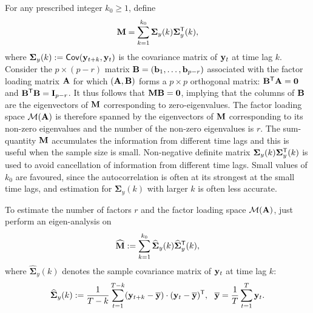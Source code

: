 \documentclass{article} %
\begin{document}


For any prescribed integer $k_0\geq 1$, define
\begin{equation}
{\bf M}=\sum_{k=1}^{k_0}{\bm\Sigma}_y(k){\bm\Sigma}^{\sf T}_y(k),
\end{equation}
where ${\bm\Sigma}_y(k):={\sf Cov}({\bf y}_{t+k},{\bf y}_t)$ is the covariance matrix of ${\bf y}_t$ at time lag $k$.
Consider the $p\times(p-r)$ matrix ${\bf B}=({\bf b}_1,\ldots,{\bf b}_{p-r})$ associated with the factor loading matrix $\bf A$ for which $({\bf A},{\bf B})$ forms a $p\times p$ orthogonal matrix: ${\bf B}^{\sf T}{\bf A}={\bf 0}$ and ${\bf B}^{\sf T}{\bf B}={\bf I}_{p-r}$. It thus follows that ${\bf MB=0}$, implying that the columns of $\bf B$ are the eigenvectors of $\bf M$ corresponding to zero-eigenvalues. The factor loading space ${\cal M}({\bf A})$ is therefore spanned by the eigenvectors of $\bf M$ corresponding to its non-zero eigenvalues and the number of the non-zero eigenvalues is $r$. The sum-quantity $\bf M$ accumulates the information from different time lags and this is useful when the sample size is small. Non-negative definite matrix ${\bf \Sigma}_y(k){\bf\Sigma}^{\sf T}_y(k)$ is used to avoid cancellation of information from different time lags. Small values of $k_0$ are favoured, since the autocorrelation is often at its strongest at the small time lags, and estimation for ${\bm\Sigma}_y(k)$ with larger $k$ is often less accurate.

To estimate the number of factors $r$ and the factor loading space ${\cal M}({\bf A})$, just perform an eigen-analysis on 
\[{\widehat{\bf M}}:=\sum_{k=1}^{k_0}{\widehat{\bm\Sigma}}_y(k){\widehat{\bm\Sigma}}^{\sf T}_y(k),\]
where ${\widehat{\bm\Sigma}}_y(k)$ denotes the sample covariance matrix of ${\bf y}_t$ at time lag $k$:
\[{\widehat{\bm\Sigma}}_y(k):=\frac{1}{T-k}\sum_{t=1}^{T-k}({\bf y}_{t+k}-{\overline{\bf y}})\cdot({\bf y}_{t}-{\overline{\bf y}})^{\sf T},~~{\overline{\bf y}}=\frac{1}{T}\sum_{t=1}^T{\bf y}_t.\] 
\end{document}
